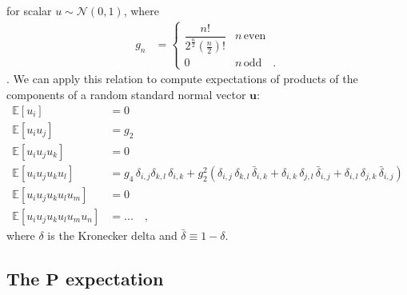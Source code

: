 \documentclass[modern]{aastex62}
\begin{document}
%
for scalar $u \sim \mathcal{N}(0, 1)$, where
%
\begin{align}
    g_n
     & =
    \begin{cases}
        \dfrac{n!}{2^\frac{n}{2} \left(\frac{n}{2}\right)!} & n \, \mathrm{even}
        \\
        0                                                   & n \, \mathrm{odd}
        \quad.
    \end{cases}
\end{align}
%
\citep[e.g.,][]{Winkelbauer2012}.
We can apply this relation to compute expectations
of products of the components of a random standard normal vector $\mathbf{u}$:
%
\begin{align}
    \mathbb{E}\left[u_i \right]                    & = 0
    \\[1em]
    \mathbb{E}\left[u_i u_j\right]                 & = g_2
    \\[1em]
    \mathbb{E}\left[u_i u_j u_k\right]             & = 0
    \\[1em]
    \mathbb{E}\left[u_i u_j u_k u_l\right]         & =
    g_4 \, \delta_{i, j} \delta_{k, l} \, \delta_{i, k}
    +
    g_2^2 \left(
    \delta_{i, j} \, \delta_{k, l} \, \bar{\delta}_{i, k}
    +
    \delta_{i, k} \, \delta_{j, l} \, \bar{\delta}_{i, j}
    +
    \delta_{i, l} \, \delta_{j, k} \, \bar{\delta}_{i, j}
    \right)
    \\[1em]
    \mathbb{E}\left[u_i u_j u_k u_l u_m\right]     & = 0
    \\[1em]
    \mathbb{E}\left[u_i u_j u_k u_l u_m u_n\right] & =
    ...
    \quad,
\end{align}
%
where $\delta$ is the Kronecker delta and $\bar{\delta} \equiv 1 - \delta$.

\subsection{The $\mathbf{P}$ expectation}
\end{document}
